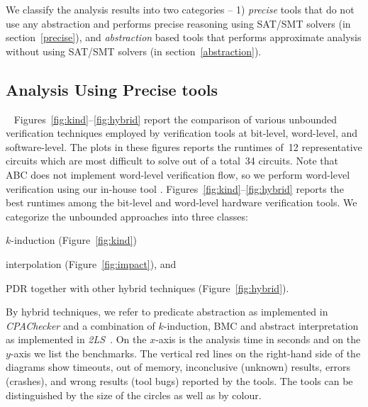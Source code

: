 %
We classify the analysis results into two categories -- 1) \emph{precise} tools 
that do not use any abstraction and performs precise reasoning using SAT/SMT solvers 
(in section~\ref{precise}), and \emph{abstraction} based tools that performs 
approximate analysis without using SAT/SMT solvers (in section~\ref{abstraction}). 
%
\subsection{Analysis Using Precise tools}~\label{precise}
%
Figures~\ref{fig:kind}--\ref{fig:hybrid} report the comparison of various unbounded 
verification techniques employed by verification tools at bit-level, word-level, 
and software-level.  The plots in these figures reports the runtimes of~12 
representative circuits which are most difficult to solve out of a total~34 
circuits.  Note that ABC does not implement word-level verification flow, 
so we perform word-level verification using our in-house tool \ebmc.
Figures~\ref{fig:kind}--\ref{fig:hybrid} reports the best runtimes 
among the bit-level and word-level hardware verification tools.  
%
We categorize the unbounded approaches into three classes:
\begin{compactitem}
\item $k$-induction (Figure~\ref{fig:kind})
\item interpolation (Figure~\ref{fig:impact}), and 
\item PDR together with other hybrid techniques (Figure~\ref{fig:hybrid}).  
\end{compactitem}
By hybrid techniques, we refer to predicate
abstraction as implemented in \emph{CPAChecker} and a combination of
$k$-induction, BMC and abstract interpretation as implemented in
\emph{2LS}~\cite{kiki}.  On the $x$-axis is the analysis time in
seconds and on the $y$-axis we list the benchmarks. The vertical red lines on
the right-hand side of the diagrams show timeouts, out of memory,
inconclusive (unknown) results, errors (crashes), and wrong results
(tool bugs) reported by the tools. The tools can be distinguished 
by the size of the circles as well as by colour. 

